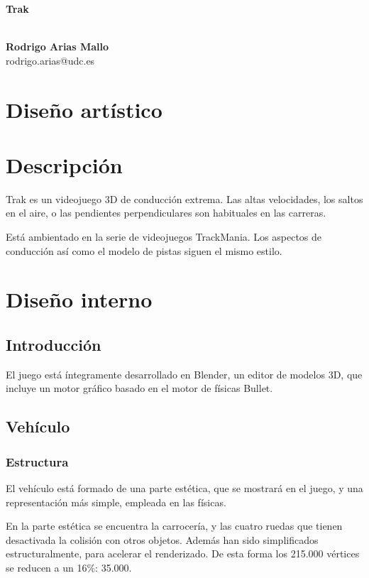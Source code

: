 \documentclass[10pt,a4paper,hidelinks]{article}
\begin{document}
\begin{center}
\begin{huge}
\textbf{Trak}
\end{huge}
\\[10pt]
\textbf{Rodrigo Arias Mallo}\\
rodrigo.arias@udc.es
\end{center}

\section{Diseño artístico}
\section{Descripción}
Trak es un videojuego 3D de conducción extrema. Las altas velocidades, los 
saltos en el aire, o las pendientes perpendiculares son habituales en las 
carreras.

Está ambientado en la serie de videojuegos TrackMania. Los aspectos de 
conducción así como el modelo de pistas siguen el mismo estilo.

\section{Diseño interno}
\subsection{Introducción}
El juego está íntegramente desarrollado en Blender, un editor de modelos 3D, que 
incluye un motor gráfico basado en el motor de físicas Bullet.

\subsection{Vehículo}
\subsubsection{Estructura}
El vehículo está formado de una parte estética, que se mostrará en el juego, y 
una representación más simple, empleada en las físicas.

En la parte estética se encuentra la carrocería, y las cuatro ruedas que tienen 
desactivada la colisión con otros objetos. Además han sido simplificados 
estructuralmente, para acelerar el renderizado. De esta forma los 215.000 
vértices se reducen a un 16\%: 35.000.
\end{document}
